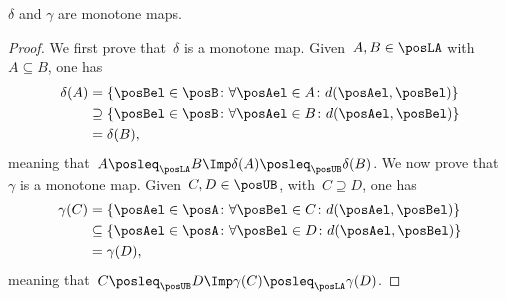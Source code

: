 \begin{lemma}
    \label{lem:deltagammamonotone}
    $\delta$ and $\gamma$ are monotone maps.
\end{lemma}
\begin{proof}
    We first prove that~$\delta$ is a monotone map. Given~$A,B\in \posLA$ with~$A\subseteq B$, one has
    \begin{equation}
        \begin{aligned}
            \delta(A)&=\{\posBel\in \posB\colon \forall \posAel \in A\colon d(\posAel,\posBel)\}\\
            &\supseteq \{\posBel\in \posB\colon \forall \posAel\in B \colon d(\posAel,\posBel)\}\\
            &=\delta(B),
        \end{aligned}
    \end{equation}
    meaning that~$A\posleq_{\posLA} B \Imp \delta(A)\posleq_{\posUB} \delta(B)$.
    We now prove that~$\gamma$ is a monotone map. Given~$C,D\in \posUB$, with~$C\supseteq D$, one has
    \begin{equation}
        \begin{aligned}
            \gamma(C)&=\{\posAel\in \posA\colon \forall \posBel \in C\colon d(\posAel,\posBel)\}\\
            &\subseteq \{\posAel\in \posA\colon \forall \posBel \in D \colon d(\posAel,\posBel)\}\\
            &=\gamma(D),
        \end{aligned}
    \end{equation}
    meaning that~$C\posleq_{\posUB} D \Imp \gamma(C)\posleq_{\posLA} \gamma(D)$.
\end{proof}

